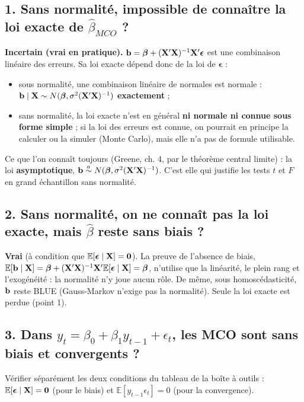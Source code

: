\documentclass[11pt,a4paper]{article}
\newcommand{\vbeta}{\bm{\beta}}\newcommand{\veps}{\bm{\epsilon}}\newcommand{\Q}{\mathbf{Q}}
\newcommand{\E}{\mathbb{E}}\newcommand{\Var}{\operatorname{Var}}\newcommand{\Cov}{\operatorname{Cov}}
\begin{document}
\subsection*{1. Sans normalité, impossible de connaître la loi exacte de $\hat\beta_{MCO}$ ?}

\begin{reponse}
\textbf{Incertain (vrai en pratique).} $\vb=\vbeta+(\vX'\vX)^{-1}\vX'\veps$ est une combinaison linéaire des erreurs. Sa loi exacte dépend donc de la loi de $\veps$ :
\begin{itemize}[nosep]
\item sous normalité, une combinaison linéaire de normales est normale : $\vb\mid\vX\sim N(\vbeta,\sigma^2(\vX'\vX)^{-1})$ \textbf{exactement} ;
\item sans normalité, la loi exacte n'est en général \textbf{ni normale ni connue sous forme simple} ; si la loi des erreurs est connue, on pourrait en principe la calculer ou la simuler (Monte Carlo), mais elle n'a pas de formule utilisable.
\end{itemize}
Ce que l'on connaît toujours (Greene, ch. 4, par le théorème central limite) : la loi \textbf{asymptotique}, $\vb\overset{a}{\sim}N(\vbeta,\sigma^2(\vX'\vX)^{-1})$. C'est elle qui justifie les tests $t$ et $F$ en grand échantillon sans normalité.
\end{reponse}

\subsection*{2. Sans normalité, on ne connaît pas la loi exacte, mais $\hat\beta$ reste sans biais ?}

\begin{reponse}
\textbf{Vrai} (à condition que $\E[\veps\mid\vX]=\mathbf 0$). La preuve de l'absence de biais, $\E[\vb\mid\vX]=\vbeta+(\vX'\vX)^{-1}\vX'\E[\veps\mid\vX]=\vbeta$, n'utilise que la linéarité, le plein rang et l'exogénéité : la normalité n'y joue aucun rôle. De même, sous homoscédasticité, $\mathbf{b}$ reste BLUE (Gauss-Markov n'exige pas la normalité). Seule la loi exacte est perdue (point 1).
\end{reponse}

\subsection*{3. Dans $y_t=\beta_0+\beta_1y_{t-1}+\epsilon_t$, les MCO sont sans biais et convergents ?}

\begin{idee}
Vérifier séparément les deux conditions du tableau de la boîte à outils : $\E[\veps\mid\vX]=\mathbf 0$ (pour le biais) et $\E[y_{t-1}\epsilon_t]=0$ (pour la convergence).
\end{idee}
\end{document}
